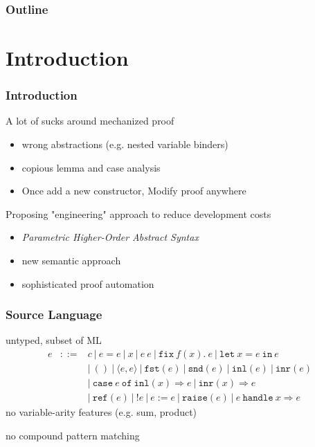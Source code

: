 \documentclass[dvipdfmx,cjk,xcolor=dvipsnames,envcountsect,notheorems,aspectratio=169]{beamer}
\theoremstyle{definition}
\newcommand{\FIX}{\texttt{fix}}
\newcommand{\LET}{\texttt{let}}
\newcommand{\IN}{\texttt{in}}
\newcommand{\FST}{\texttt{fst}}
\newcommand{\SND}{\texttt{snd}}
\newcommand{\INL}{\texttt{inl}}
\newcommand{\INR}{\texttt{inr}}
\newcommand{\CASE}{\texttt{case}}
\newcommand{\OF}{\texttt{of}}
\newcommand{\REF}{\texttt{ref}}
\newcommand{\RAISE}{\texttt{raise}}
\newcommand{\HANDLE}{\texttt{handle}}
\begin{document}
\begin{frame}
  \frametitle{Outline}
  \tableofcontents[sectionstyle=show,subsectionstyle=hide]
\end{frame}

\section{Introduction}

\begin{frame}
	\frametitle{Introduction}
	\LARGE A lot of sucks around mechanized proof
	\begin{itemize}
		\item wrong abstractions (e.g. nested variable binders)
		\item copious lemma and case analysis
		\item Once add a new constructor, Modify proof anywhere
	\end{itemize}

	\vfill

	Proposing "engineering" approach to reduce development costs
	\begin{itemize}
		\item {\it Parametric Higher-Order Abstract Syntax}
		\item new semantic approach
		\item sophisticated proof automation
	\end{itemize}
\end{frame}

\begin{frame}
	\frametitle{Source Language}
	\LARGE untyped, subset of ML
	\[
		\begin{array}{lcl}
			e & ::= & c~|~e=e~|~x~|~e~e~|~\FIX~f(x).~e~|~\LET~x=e~\IN~e \\
				&     & |~()~|~\langle e,e\rangle~|~\FST(e)~|~\SND(e)~|~\INL(e)~|~\INR(e) \\
				&     & |~\CASE~e~\OF~\INL(x)\Rightarrow e~|~\INR(x)\Rightarrow e \\
				&     & |~\REF(e)~|~!e~|~e := e~|~\RAISE(e)~|~e~\HANDLE~x\Rightarrow e
		\end{array}
	\]
	no variable-arity features (e.g. sum, product)

	no compound pattern matching
\end{frame}
\end{document}
